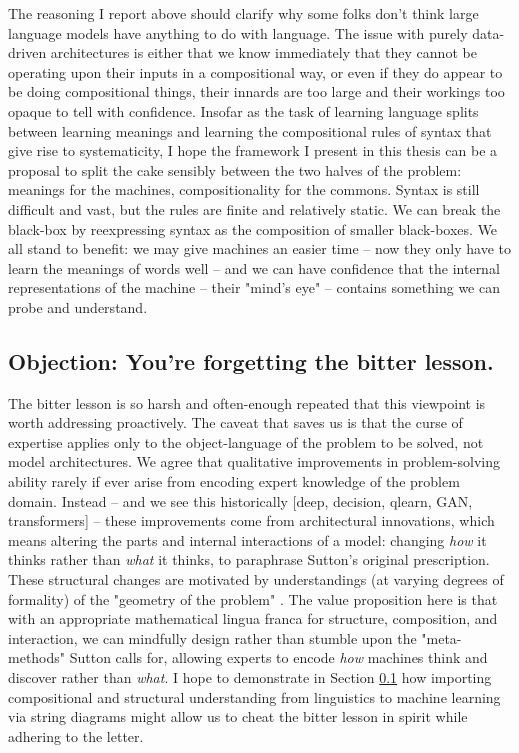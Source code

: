 \begin{fullwidth}
\begin{multicols}{2}
The reasoning I report above should clarify why some folks don't think large language models have anything to do with language. The issue with purely data-driven architectures is either that we know immediately that they cannot be operating upon their inputs in a compositional way, or even if they do appear to be doing compositional things, their innards are too large and their workings too opaque to tell with confidence. Insofar as the task of learning language splits between learning meanings and learning the compositional rules of syntax that give rise to systematicity, I hope the framework I present in this thesis can be a proposal to split the cake sensibly between the two halves of the problem: meanings for the machines, compositionality for the commons. Syntax is still difficult and vast, but the rules are finite and relatively static. We can break the black-box by reexpressing syntax as the composition of smaller black-boxes. We all stand to benefit: we may give machines an easier time -- now they only have to learn the meanings of words well -- and we can have confidence that the internal representations of the machine -- their "mind's eye" -- contains something we can probe and understand.

\subsection{\textbf{Objection:} You're forgetting the bitter lesson.}

The bitter lesson is so harsh and often-enough repeated that this viewpoint is worth addressing proactively. The caveat that saves us is that the curse of expertise applies only to the object-language of the problem to be solved, not model architectures. We agree that qualitative improvements in problem-solving ability rarely if ever arise from encoding expert knowledge of the problem domain. Instead -- and we see this historically \citep{}[deep, decision, qlearn, GAN, transformers] -- these improvements come from architectural innovations, which means altering the parts and internal interactions of a model: changing \emph{how} it thinks rather than \emph{what} it thinks, to paraphrase Sutton's original prescription. These structural changes are motivated by understandings (at varying degrees of formality) of the "geometry of the problem" \citep{}. The value proposition here is that with an appropriate mathematical lingua franca for structure, composition, and interaction, we can mindfully design rather than stumble upon the "meta-methods" Sutton calls for, allowing experts to encode \emph{how} machines think and discover rather than \emph{what}. I hope to demonstrate in Section \ref{} how importing compositional and structural understanding from linguistics to machine learning via string diagrams might allow us to cheat the bitter lesson in spirit while adhering to the letter.


\end{multicols}
\end{fullwidth}
